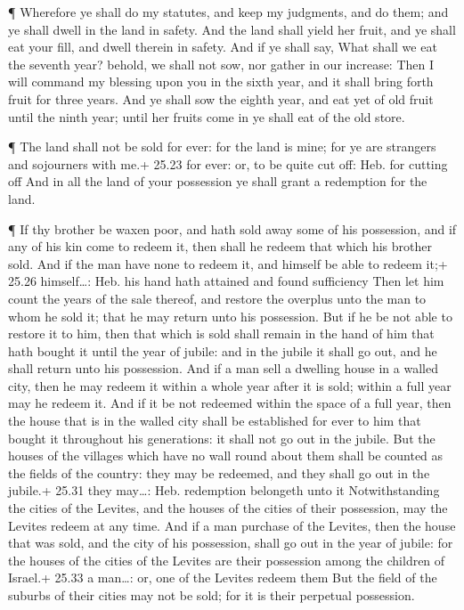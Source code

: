  ¶ Wherefore ye shall do my statutes, and keep my
judgments, and do them; and ye shall dwell in the land in safety.
 And the land shall yield her fruit, and ye shall eat your
fill, and dwell therein in safety.  And if ye shall say,
What shall we eat the seventh year? behold, we shall not sow, nor gather
in our increase:  Then I will command my blessing upon you
in the sixth year, and it shall bring forth fruit for three years.
 And ye shall sow the eighth year, and eat yet of old fruit
until the ninth year; until her fruits come in ye shall eat of the old
store.

 ¶ The land shall not be sold for ever: for the land is
mine; for ye are strangers and sojourners with me.+ 25.23 for ever: or,
to be quite cut off: Heb. for cutting off  And in all the
land of your possession ye shall grant a redemption for the land.

 ¶ If thy brother be waxen poor, and hath sold away some of
his possession, and if any of his kin come to redeem it, then shall he
redeem that which his brother sold.  And if the man have
none to redeem it, and himself be able to redeem it;+ 25.26
himself\ldots: Heb. his hand hath attained and found sufficiency
 Then let him count the years of the sale thereof, and
restore the overplus unto the man to whom he sold it; that he may return
unto his possession.  But if he be not able to restore it
to him, then that which is sold shall remain in the hand of him that
hath bought it until the year of jubile: and in the jubile it shall go
out, and he shall return unto his possession.  And if a man
sell a dwelling house in a walled city, then he may redeem it within a
whole year after it is sold; within a full year may he redeem it.
 And if it be not redeemed within the space of a full year,
then the house that is in the walled city shall be established for ever
to him that bought it throughout his generations: it shall not go out in
the jubile.  But the houses of the villages which have no
wall round about them shall be counted as the fields of the country:
they may be redeemed, and they shall go out in the jubile.+ 25.31 they
may\ldots: Heb. redemption belongeth unto it 
Notwithstanding the cities of the Levites, and the houses of the cities
of their possession, may the Levites redeem at any time. 
And if a man purchase of the Levites, then the house that was sold, and
the city of his possession, shall go out in the year of jubile: for the
houses of the cities of the Levites are their possession among the
children of Israel.+ 25.33 a man\ldots: or, one of the Levites redeem
them  But the field of the suburbs of their cities may not
be sold; for it is their perpetual possession.

